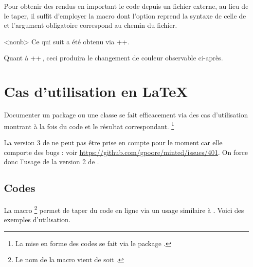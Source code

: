Pour obtenir des rendus en important le code depuis un fichier externe, au lieu de le taper, il suffit d'employer la macro  dont l'option reprend la syntaxe de celle de  et l'argument obligatoire correspond au chemin du fichier.


\begin{tdocexa}<nonb>
    Ce qui suit a été obtenu via \tdocinlatex++.

    \medskip



    \medskip

    Quant à \tdocinlatex++\,, ceci produira le changement de couleur observable ci-après.

    \medskip


\end{tdocexa}


\section{Cas d'utilisation en \LaTeX}

Documenter un package ou une classe se fait efficacement via des cas d'utilisation montrant à la fois du code et le résultat correspondant.%
\footnote{
	La mise en forme des codes se fait via le package .
}

\begin{tdocwarn}
	La version 3 de  ne peut pas être prise en compte pour le moment car elle comporte des bugs : voir \url{https://github.com/gpoore/minted/issues/401}. On force donc l'usage de la version 2 de .
\end{tdocwarn}


\subsection{Codes } \label{tdoc-listing-inline}

La macro 
\footnote{
    Le nom de la macro  vient de  soit .
}
permet de taper du code en ligne via un usage similaire à .
Voici des exemples d'utilisation.


